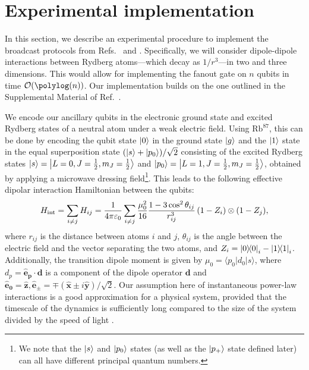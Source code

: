 \section{Experimental implementation}
\label{sec:III}
In this section, we describe an experimental procedure to implement the broadcast protocols from Refs.~\cite{Eldredge2017} and \cite{Tran2021a}.
Specifically, we will consider dipole-dipole interactions between Rydberg atoms---which decay as $1/r^3$---in two and three dimensions.
This would allow for implementing the fanout gate on $n$ qubits in time $\O{\polylog(n)}$.
Our implementation builds on the one outlined in the Supplemental Material of Ref.~\cite{Eldredge2017}.

We encode our ancillary qubits in the electronic ground state and excited Rydberg states of a neutral atom under a weak electric field.
Using $\text{Rb}^{87}$, this can be done by encoding the qubit state $\left | 0 \right\rangle$ in the ground state $\left | g \right\rangle$ and the $\left | 1 \right\rangle$ state in the equal superposition state $(\left | s \right\rangle + \left | p_0 \right\rangle)/\sqrt{2}$ consisting of the excited Rydberg states $\left | s \right\rangle = \left | L=0,J=\frac12,m_J=\frac12 \right\rangle$ and $\left | p_0 \right\rangle = \left | L=1,J=\frac12,m_J=\frac12 \right\rangle$, obtained by applying a microwave dressing field\footnote{We note that the $\left | s \right\rangle$ and $\left | p_0 \right\rangle$ states (as well as the $\left | p_+ \right\rangle$ state defined later) can all have different principal quantum numbers.}.
This leads to the following effective dipolar interaction Hamiltonian between the qubits:
\begin{align}
\label{eq:dipole-Ham}
  H_\mathrm{int} = \sum_{i\neq j} H_{ij} = \frac{1}{4\pi\varepsilon_0} \sum_{i\neq j} \frac{\mu_0^2}{16} \frac{1-3\cos^2\theta_{ij}}{r_{ij}^3} \,(1-Z_i)\otimes (1-Z_j),
\end{align}
where $r_{ij}$ is the distance between atoms $i$ and $j$, $\theta_{ij}$ is the angle between the electric field and the vector separating the two atoms, and $Z_i = \ketbra{0}_i - \ketbra{1}_i$.
Additionally, the transition dipole moment is given by $\mu_0 = \langle p_0 |d_0| s\rangle$, where $d_p = \mathbf{\hat{e}_p} \cdot \mathbf{d}$ is a component of the dipole operator $\mathbf{d}$ and $\mathbf{\hat{e}_0} = \mathbf{\hat{z}},\mathbf{\hat{e}_{\pm}} = \mp (\mathbf{\hat{x}}\pm i \mathbf{\hat{y}})/\sqrt{2}$.
Our assumption here of instantaneous power-law interactions is a good approximation for a physical system, provided that the timescale of the dynamics is sufficiently long compared to the size of the system divided by the speed of light \cite{Chang2012}.

